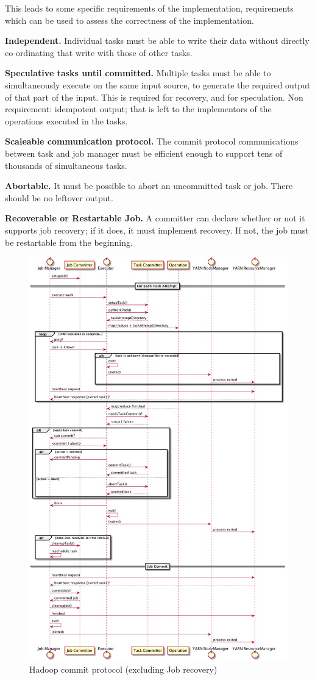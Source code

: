 \documentclass[conference]{IEEEtran}
\begin{document}
This leads to some specific requirements of the implementation, requirements
which can be used to assess the correctness of the implementation.

\textbf{Independent.}
Individual tasks must be able to write their data without directly
co-ordinating that write with those of other tasks.

\textbf{Speculative tasks until committed.}
Multiple tasks must be able to simultaneously execute on the same input
source, to generate the required output of that part of the input.
This is required for recovery, and for speculation.
Non requirement: idempotent output;
that is left to the implementors of the operations executed in the tasks.

\textbf{Scaleable communication protocol.}
The commit protocol communications between task and job manager
must be efficient enough to support tens of thousands of simultaneous
tasks.

\textbf{Abortable.}
It must be possible to abort an uncommitted task or job.
There should be no leftover output.

\textbf{Recoverable or Restartable Job.}
A committer can declare whether or not it supports job recovery;
if it does, it must implement recovery.
If not, the job must be restartable from the beginning.

\begin{figure}
  \centering
  \includegraphics[width=.8\textwidth]{commit-protocol.png}
  \caption{Hadoop commit protocol (excluding Job recovery)}
  \label{fig:commit-protocol}
\end{figure}
\end{document}
